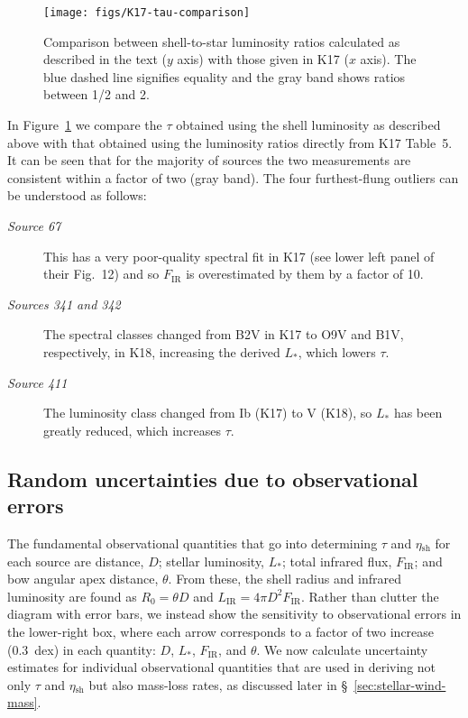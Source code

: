 \documentclass[useAMS, usenatbib, a4paper]{mnras}
\newcommand\shell{\ensuremath{_{\text{sh}}}}
\begin{document}
\begin{figure}
  \centering
  \texttt{[image: figs/K17-tau-comparison]}
  \caption{Comparison between shell-to-star luminosity ratios
    calculated as described in the text (\(y\) axis) with those given
    in K17 (\(x\) axis).  The blue dashed line signifies equality and
    the gray band shows ratios between 1/2 and 2.}
  \label{fig:k17-k18-comparison}
\end{figure}

In Figure~\ref{fig:k17-k18-comparison} we compare the \(\tau\) obtained
using the shell luminosity as described above with that obtained using
the luminosity ratios directly from K17 Table~5.  It can be seen that
for the majority of sources the two measurements are consistent within
a factor of two (gray band).  The four furthest-flung outliers can be
understood as follows:
\begin{description}
\item[\textit{Source 67}] This has a very poor-quality spectral fit in
  K17 (see lower left panel of their Fig.~12) and so 
  \(F_{\text{IR}}\) is overestimated by them by a factor of 10.
\item[\textit{Sources 341 and 342}] The spectral classes changed from
  B2V in K17 to O9V and B1V, respectively, in K18, increasing the
  derived \(L_*\), which lowers \(\tau\).
\item[\textit{Source 411}] The luminosity class changed from Ib (K17)
  to V (K18), so \(L_*\) has been greatly reduced, which increases
  \(\tau\).
\end{description}


\subsection{Random uncertainties due to observational errors}
\label{sec:rand-syst-uncert}

The fundamental observational quantities that go into determining
\(\tau\) and \(\eta\shell\) for each source are distance, \(D\); stellar
luminosity, \(L_*\); total infrared flux, \(F_{\text{IR}}\); and bow
angular apex distance, \(\theta\).  From these, the shell radius and
infrared luminosity are found as \(R_0 = \theta D\) and
\(L_{\text{IR}} = 4\pi D^2 F_{\text{IR}}\).  Rather than clutter the
diagram with error bars, we instead show the sensitivity to
observational errors in the lower-right box, where each arrow
corresponds to a factor of two increase (0.3~dex) in each quantity:
\(D\), \(L_*\), \(F_{\text{IR}}\), and \(\theta\).  We now calculate
uncertainty estimates for individual observational quantities that are
used in deriving not only \(\tau\) and \(\eta\shell\) but also mass-loss
rates, as discussed later in \S~\ref{sec:stellar-wind-mass}.
\end{document}
